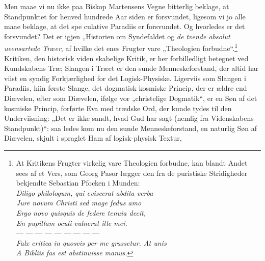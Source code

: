 \documentclass[12pt]{book}
\newcommand{\opage}[1]{\marginnote{\footnotesize\textit{[#1]}}}
\begin{document}
Men maae vi nu ikke paa Biskop Martensens Vegne
bitterlig beklage, at Standpunktet for henved hundrede Aar
siden er forsvundet, ligesom vi jo alle maae beklage, at det spe\-%
culative Paradiis er forsvundet. Og hvorledes er det forsvundet?
Det er igjen „Historien om Syndefaldet og \emph{de tvende
absolut ueensartede Træer}, af hvilke det enes Frugter
vare „Theologien forbudne“.\footnote{At Kritikens Frugter virkelig vare
Theologien forbudne, kan blandt Andet sees af et Vers, som Georg Pasor
lægger den fra de puristiske Stridigheder bekjendte Sebastian Pfocken i
Munden:\\
\hspace*{2em}\textit{Diligo philologum, qui eviscerat abdita verba}\\
\hspace*{2em}\textit{Jure novum Christi sed mage fedus amo}\\
\hspace*{2em}\textit{Ergo novo quisquis de federe tenuia decit,}\\
\hspace*{2em}\textit{En pupillam oculi vulnerat ille mei.}\\
\hspace*{2em}--- --- --- --- --- --- --- --- ---\\
\hspace*{2em}\textit{Falx critica in quosvis per me grassetur. At unis}\\
\hspace*{2em}\textit{A Bibliis fas est abstinuisse manus.}} Kritiken, den historisk viden\-%
skabelige Kritik, er her forbilledligt betegnet ved Kundskabens
\opage{48}\setcounter{footnote}{0}%
Træ; Slangen i Træet er den sunde Menneskeforstand, der
altid har viist en syndig Forkjærlighed for det Logisk-Physiske.
Ligerviis som Slangen i Paradiis, hiin første Slange, det
dogmatisk kosmiske Princip, der er ældre end Diævelen, efter\-%
som Diævelen, ifølge vor „christelige Dogmatik“, er en Søn
af det kosmiske Princip, forførte Eva med trædske Ord, der
kunde tydes til den Underviisning: „Det er ikke sandt, hvad
Gud har sagt (nemlig fra Videnskabens Standpunkt)“: saa\-%
ledes kom nu den sunde Menneskeforstand, en naturlig Søn
af Diævelen, skjult i spraglet Ham af logisk-physisk Textur,
\end{document}
